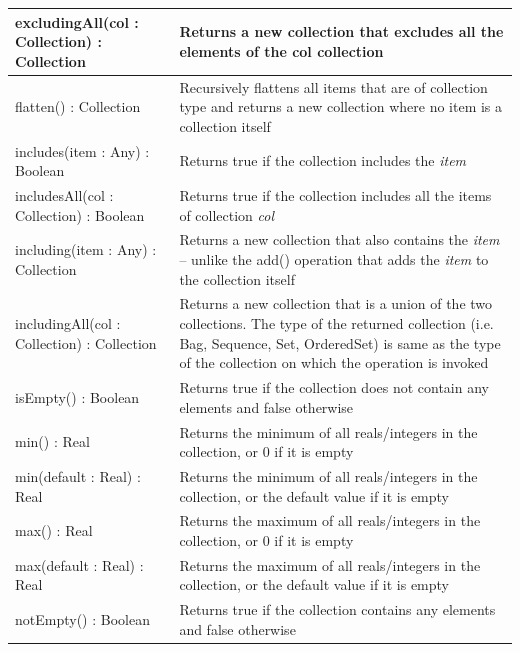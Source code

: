 \begin{longtabu} {|p{6.5cm}|X|}
    excludingAll(col : Collection) : Collection & Returns a new collection that excludes all the elements of the col collection \\\hline
    
    flatten() : Collection & Recursively flattens all items that are of collection type and returns a new collection where no item is a collection itself \\\hline
    
    includes(item : Any) : Boolean & Returns true if the collection includes the \emph{item} \\\hline
    
    includesAll(col : Collection) : Boolean & Returns true if the collection includes all the items of collection \emph{col} \\\hline
    
    including(item : Any) : Collection & Returns a new collection that also contains the \emph{item} -- unlike the add() operation that adds the \emph{item} to the collection itself  \\\hline
    
    includingAll(col : Collection) : Collection & Returns a new collection that is a union of the two collections. The type of the returned collection (i.e. Bag, Sequence, Set, OrderedSet) is same as the type of the collection on which the operation is invoked \\\hline
    
    isEmpty() : Boolean & Returns true if the collection does not contain any elements and false otherwise \\\hline

    min() : Real & Returns the minimum of all reals/integers in the collection, or 0 if it is empty \\\hline

    min(default : Real) : Real & Returns the minimum of all reals/integers in the collection, or the default value if it is empty \\\hline

    max() : Real & Returns the maximum of all reals/integers in the collection, or 0 if it is empty \\\hline

    max(default : Real) : Real & Returns the maximum of all reals/integers in the collection, or the default value if it is empty \\\hline

    notEmpty() : Boolean & Returns true if the collection contains any elements and false otherwise \\\hline


\end{longtabu}
